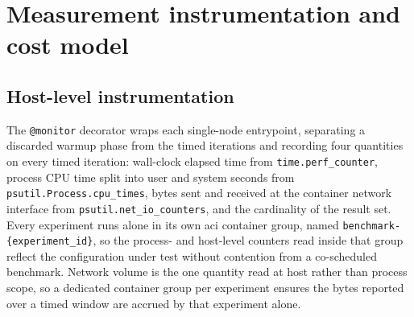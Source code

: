 \section{Measurement instrumentation and cost model}
\label{system-architecture-and-implementation:measurement-instrumentation-and-cost-model}


\subsection{Host-level instrumentation}
\label{system-architecture-and-implementation:measurement-instrumentation-and-cost-model:host-level-instrumentation}

The \texttt{@monitor} decorator wraps each single-node entrypoint, separating a discarded warmup phase from the timed iterations and recording four quantities on every timed iteration: wall-clock elapsed time from \texttt{time.perf\_counter}, process CPU time split into user and system seconds from \texttt{psutil.Process.cpu\_times}, bytes sent and received at the container network interface from \texttt{psutil.net\_io\_counters}, and the cardinality of the result set. Every experiment runs alone in its own \acrshort{aci} container group, named \texttt{benchmark-\{experiment\_id\}}, so the process- and host-level counters read inside that group reflect the configuration under test without contention from a co-scheduled benchmark. Network volume is the one quantity read at host rather than process scope, so a dedicated container group per experiment ensures the bytes reported over a timed window are accrued by that experiment alone.

